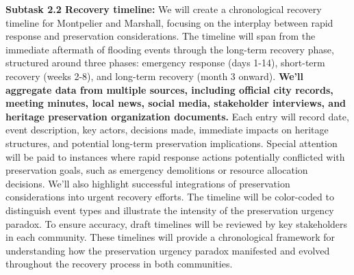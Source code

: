 \documentclass[11pt]{article}
\begin{document}
\textbf{Subtask 2.2 Recovery timeline:} 
We will create a chronological recovery timeline for Montpelier and Marshall, focusing on the interplay between rapid response and preservation considerations. 
The timeline will span from the immediate aftermath of flooding events through the long-term recovery phase, structured around three phases: emergency response (days 1-14), short-term recovery (weeks 2-8), and long-term recovery (month 3 onward). 
\textbf{We'll aggregate data from multiple sources, including official city records, meeting minutes, local news, social media, stakeholder interviews, and heritage preservation organization documents. }
Each entry will record date, event description, key actors, decisions made, immediate impacts on heritage structures, and potential long-term preservation implications. 
Special attention will be paid to instances where rapid response actions potentially conflicted with preservation goals, such as emergency demolitions or resource allocation decisions. 
We'll also highlight successful integrations of preservation considerations into urgent recovery efforts. 
The timeline will be color-coded to distinguish event types and illustrate the intensity of the preservation urgency paradox. 
To ensure accuracy, draft timelines will be reviewed by key stakeholders in each community. 
These timelines will provide a chronological framework for understanding how the preservation urgency paradox manifested and evolved throughout the recovery process in both communities.
\end{document}
